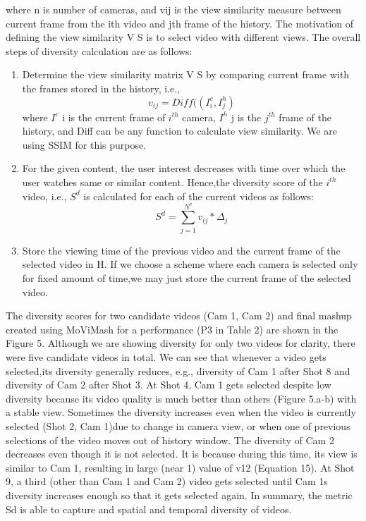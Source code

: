 \documentclass{sig-alternate}
\begin{document}
where n is number of cameras, and vij is the view similarity measure between current frame from the ith video and jth frame of the history. The motivation of defining the view similarity V S is to select video with different views. The overall steps of diversity calculation are as follows:
\begin{enumerate}
    \item Determine the view similarity matrix V S by comparing current frame with the frames stored in the history, i.e.,
    \[
     v_{ij} = Diff((I_i^c,I_j^h)
    \]
    where $I^c$ i is the current frame of $i^{th}$ camera, $I^h$ j is the $j^{th}$ frame of the history, and Diff can be any function to calculate view similarity. We are using SSIM \cite{web:17} for this purpose.
    \item For the given content, the user interest decreases with time over which the user watches same or similar content. Hence,the diversity score of the $i^{th}$ video, i.e., $S^d$ is calculated for each of the current videos as follows:
    \[
      S^d = \sum_{j=1}^{N^v}v_{ij}*\Delta_j
    \]
    \item Store the viewing time of the previous video and the current frame of the selected video in H. If we choose a scheme where each camera is selected only for fixed amount of time,we may just store the current frame of the selected video.
\end{enumerate}
The diversity scores for two candidate videos (Cam 1, Cam 2) and final mashup created using MoViMash for a performance (P3 in Table 2) are shown in the Figure 5. Although we are showing
diversity for only two videos for clarity, there were five candidate videos in total. We can see that whenever a video gets selected,its diversity generally reduces, e.g., diversity of Cam 1 after Shot 8 and diversity of Cam 2 after Shot 3. At Shot 4, Cam 1 gets selected despite low diversity because its video quality is much better than others (Figure 5.a-b) with a stable view. Sometimes the diversity increases even when the video is currently selected (Shot 2, Cam 1)due to change in camera view, or when one of previous selections of the video moves out of history window. The diversity of Cam 2 decreases even though it is not selected. It is because during this time, its view is similar to Cam 1, resulting in large (near 1) value of v12 (Equation 15). At Shot 9, a third (other than Cam 1 and Cam 2) video gets selected until Cam 1\textquotesingle s diversity increases enough so that it gets selected again. In summary, the metric Sd is able to
capture and spatial and temporal diversity of videos.
\end{document}
